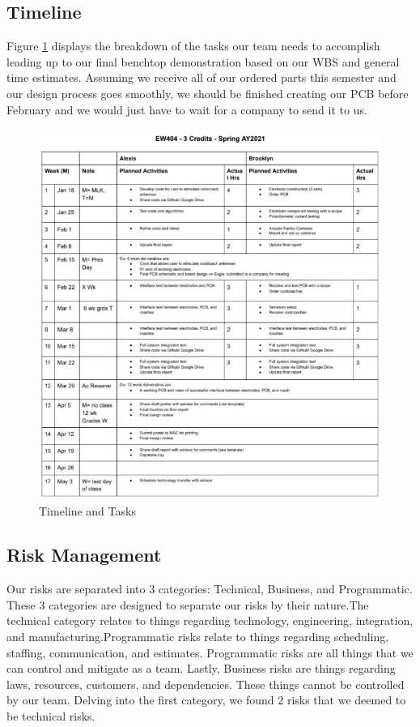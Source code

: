 \documentclass{article}
\begin{document}
\subsection{Timeline}
\par Figure \ref{fig:timeline} displays the breakdown of the tasks our team needs to accomplish leading up to our final benchtop demonstration based on our WBS and general time estimates. Assuming we receive all of our ordered parts this semester and our design process goes smoothly, we should be finished creating our PCB before February and we would just have to wait for a company to send it to us.

\begin{figure}[ht!]
\centering
\includegraphics[scale=0.6]{TIMELINE.JPG}
\caption{Timeline and Tasks}
\label{fig:timeline}
\end{figure}

\subsection{Risk Management}
Our risks are separated into 3 categories: Technical, Business, and Programmatic. These 3 categories are designed to separate our risks by their nature.The technical category relates to things regarding technology, engineering, integration, and manufacturing.Programmatic risks relate to things regarding scheduling, staffing, communication, and estimates. Programmatic risks are all things that we can control and mitigate as a team. Lastly, Business risks are things regarding laws, resources, customers, and dependencies. These things cannot be controlled by our team. Delving into the first category, we found 2 risks that we deemed to be technical risks. 
\end{document}

